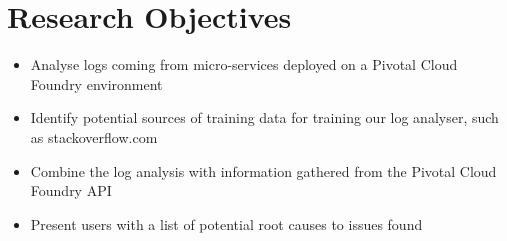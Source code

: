 \chapter{Research Objectives}

\begin{itemize}
  \item Analyse logs coming from micro-services deployed on a Pivotal Cloud Foundry environment
  \item Identify potential sources of training data for training our log analyser, such as stackoverflow.com
  \item Combine the log analysis with information gathered from the Pivotal Cloud Foundry API
  \item Present users with a list of potential root causes to issues found
\end{itemize}